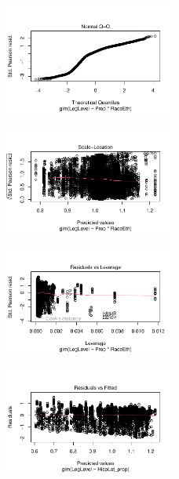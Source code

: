 \documentclass[
  letterpaper,
  DIV=11,
  numbers=noendperiod]{scrartcl}
\begin{document}
\begin{figure}[H]

{\centering \includegraphics[width=0.5\textwidth,height=\textheight]{appendix_files/figure-pdf/unnamed-chunk-6-2.pdf}

}

\end{figure}

\begin{figure}[H]

{\centering \includegraphics[width=0.5\textwidth,height=\textheight]{appendix_files/figure-pdf/unnamed-chunk-6-3.pdf}

}

\end{figure}

\begin{figure}[H]

{\centering \includegraphics[width=0.5\textwidth,height=\textheight]{appendix_files/figure-pdf/unnamed-chunk-6-4.pdf}

}

\end{figure}

\begin{figure}[H]

{\centering \includegraphics[width=0.5\textwidth,height=\textheight]{appendix_files/figure-pdf/unnamed-chunk-6-5.pdf}

}

\end{figure}
\end{document}
